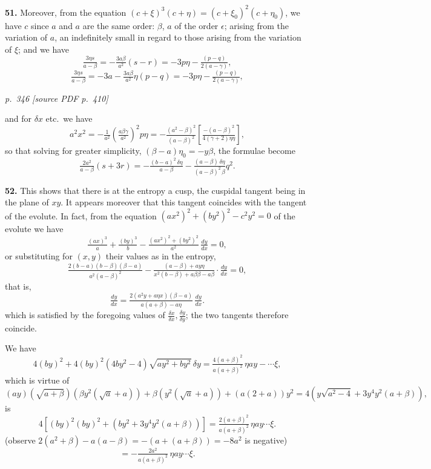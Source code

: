 \documentclass[11pt,a4paper]{article}
\newcommand{\pagemarker}[2]{\par\bigskip\noindent\textit{p.~#1 [source PDF p.~#2]}\par\smallskip}
\begin{document}
\textbf{51.} Moreover, from the equation $(c + \xi)^3 (c + \eta) = (c + \xi_0)^2(c + \eta_0)$, we have $c$ since $a$ and $a$ are the same order: $\beta$, $a$ of the order $\epsilon$; arising from the variation of $a$, an indefinitely small in regard to those arising from the variation of $\xi$; and we have
\[
\tfrac{3\eta s}{a - \beta} = -\tfrac{3a\beta}{a^2}(s - r) = -3p\eta - \tfrac{(p - q)}{2(a - \gamma)},
\]
\[
\tfrac{3\eta s}{a - \beta} = -3a - \tfrac{3a\beta}{a^2}\eta(p - q) = -3p\eta - \tfrac{(p - q)}{2(a - \gamma)},
\]

\clearpage

\bigskip
\pagemarker{346}{410}
\smallskip

and for $\delta x$ etc.\ we have
\[
a^2 x^2 = -\tfrac{1}{a^2}\!\left(\tfrac{a\beta\gamma}{a^2}\right)^2 p\eta = -\tfrac{(a^2 - \beta)^2}{(a - \beta)^2}\!\left[\tfrac{-(a - \beta)^2}{4(\gamma + 2)\eta\eta}\right],
\]
so that solving for greater simplicity, $(\beta - a)\eta_0 = -y\beta$, the formulae become
\[
\tfrac{2a^2}{a - \beta}(s + 3r) = -\tfrac{(b - a)^2 \, \delta\eta}{a - \beta} - \tfrac{(a - \beta) \, \delta\eta}{(a - \beta)^2 \, \beta} q^2.
\]

\textbf{52.} This shows that there is at the entropy a cusp, the cuspidal tangent being in the plane of $xy$. It appears moreover that this tangent coincides with the tangent of the evolute. In fact, from the equation $(ax^2)^2 + (by^2)^2 - c^2 y^2 = 0$ of the evolute we have
\[
\tfrac{(ax)^3}{a} + \tfrac{(by)^3}{b} - \tfrac{(ax^2)^2 + (by^2)^2}{a^2}\,\tfrac{dy}{dx} = 0,
\]
or substituting for $(x, y)$ their values as in the entropy,
\[
\tfrac{2(b - a)(b - \beta)(\beta - a)}{a^2(a - \beta)^2} - \tfrac{(a - \beta) + a y\eta}{x^2(b - \beta) + a\beta\beta - a\beta}\cdot\tfrac{dy}{dx} = 0,
\]
that is,
\[
\tfrac{dy}{dx} = \tfrac{2(a^2 y + a\eta x)(\beta - a)}{a(a + \beta) - a\eta}\,\tfrac{dy}{dx}.
\]
which is satisfied by the foregoing values of $\tfrac{\delta x}{\delta x}, \tfrac{\delta y}{\delta y}$; the two tangents therefore coincide.

We have
\[
4(by)^2 + 4(by)^2 (4by^2 - 4)\sqrt{a y^2 + b y^2}\,\delta y = \tfrac{4(a + \beta)^2}{a(a + \beta)^2}\,\eta a y - \cdots\xi,
\]
which is virtue of
\[
(ay)(\sqrt{a + \beta})(\beta y^2(\sqrt{a} + a)) + \beta(y^2(\sqrt{a} + a)) + (a(2 + a))y^2 = 4(y\sqrt{a^2 - 4} + 3y^4 y^2(a + \beta)),
\]
is
\[
4[(by)^2(by)^2 + (by^2 + 3y^4 y^2(a + \beta))] = \tfrac{2(a + \beta)^2}{a(a + \beta)^2}\,\eta a y \cdots\xi.
\]
(observe $2(a^2 + \beta) - a(a - \beta) = -(a + (a + \beta)) = -8a^2$ is negative)
\[
= -\tfrac{2a^2}{a(a + \beta)^2}\,\eta a y \cdots\xi.
\]
\end{document}
